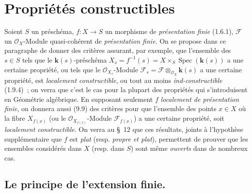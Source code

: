 \section{Propriétés constructibles}
\label{section:IV.9-fr}

Soient $S$ un préschéma, $f:X\to S$ un morphisme de
\emph{présentation finie} (1.6.1), $\mathcal F$ un $\mathcal O_X$-Module
quasi-cohérent de \emph{présentation finie}. On se propose dans ce paragraphe
de donner des critères assurant, par exemple, que l'ensemble des $s\in S$ tels
que le $\boldsymbol{k}(s)$-préschéma
$X_s=f^{-1}(s)=X\times_S\operatorname{Spec}(\boldsymbol{k}(s))$ a une certaine propriété,
ou tels que le $\mathcal O_{X_s}$-Module
$\mathcal F_s=\mathcal F\otimes_{\mathcal O_X}\boldsymbol{k}(s)$ a une certaine propriété,
est \emph{localement constructible}, ou tout au moins
\emph{ind-constructible} (1.9.4)~; on verra que c'est le cas pour la plupart
des propriétés qui s'introduisent en Géométrie algébrique. En supposant
seulement $f$ \emph{localement de présentation finie}, on donnera aussi (9.9)
des critères pour que l'ensemble des points $x\in X$ où la fibre $X_{f(x)}$
(ou le $\mathcal O_{X_{f(x)}}$-Module $\mathcal F_{f(x)}$) a une certaine
propriété, soit \emph{localement constructible}. On verra au \S~12 que ces
résultats, joints à l'hypothèse supplémentaire que $f$ est \emph{plat}
(resp. \emph{propre et plat}), permettent de prouver que les ensembles
considérés dans $X$ (resp. dans $S$) sont même \emph{ouverts} dans de nombreux
cas.

\subsection{Le principe de l'extension finie.}
\label{subsection:IV.9.1-fr}

